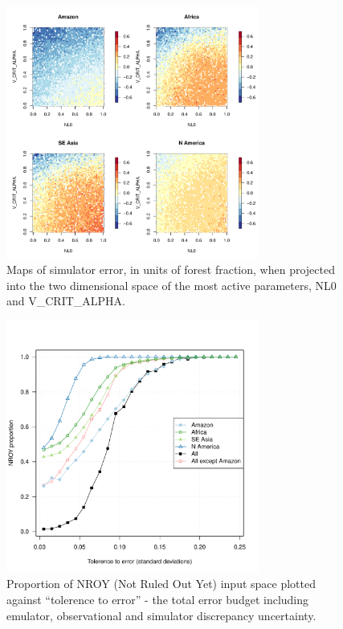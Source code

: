 \documentclass[esd, article]{copernicus} %
\providecommand{\DIFaddbeginFL}{} %
\providecommand{\DIFaddendFL}{} %
\providecommand{\DIFdelbeginFL}{} %
\providecommand{\DIFdelendFL}{} %
\begin{document}
\begin{figure}[t]
\DIFdelbeginFL %
\DIFdelendFL \DIFaddbeginFL \includegraphics[width=8.3cm]{graphics/discrepancy_parameter_space.pdf}
\DIFaddendFL \caption{Maps of simulator error, in units of forest fraction, when projected into the two dimensional space of the most active parameters, NL0 and V\_CRIT\_ALPHA.}
\label{fig:discrepancy_parameter_space}
\end{figure}

\begin{figure}[t]
\DIFdelbeginFL %
\DIFdelendFL \DIFaddbeginFL \includegraphics[width=8.3cm]{graphics/Prop_NROY_tolerance_unc.pdf}
\DIFaddendFL \caption{Proportion of NROY (Not Ruled Out Yet) input space plotted against ``tolerence to error'' - the total error budget including emulator, observational and simulator discrepancy uncertainty.}
\label{fig:Prop_NROY_tolerance_unc}
\end{figure}
\end{document}
